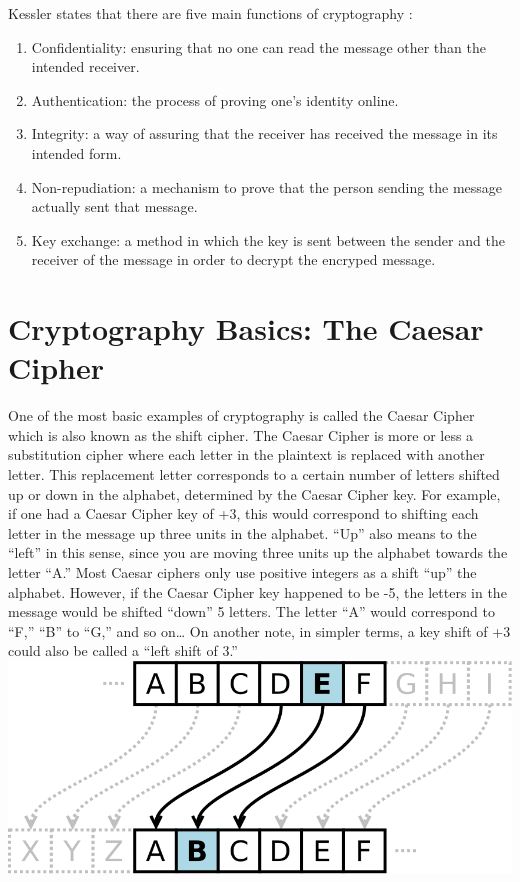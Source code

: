 \documentclass{article}
\begin{document}
Kessler states that there are five main functions of cryptography \cite{ref2:2}:
\begin{enumerate}
    \item Confidentiality: ensuring that no one can read the message other than the intended receiver.
    \item Authentication: the process of proving one’s identity online.
    \item Integrity: a way of assuring that the receiver has received the message in its intended form.
    \item Non-repudiation: a mechanism to prove that the person sending the message actually sent that message.
    \item Key exchange: a method in which the key is sent between the sender and the receiver of the message in order to decrypt the encryped message.
\end{enumerate}

\section{Cryptography Basics: The Caesar Cipher}
One of the most basic examples of cryptography is called the Caesar Cipher which is also known as the shift cipher. The Caesar Cipher is more or less a substitution cipher where each letter in the plaintext is replaced with another letter. This replacement letter corresponds to a certain number of letters shifted up or down in the alphabet, determined by the Caesar Cipher key. For example, if one had a Caesar Cipher key of +3, this would correspond to shifting each letter in the message up three units in the alphabet. “Up” also means to the “left” in this sense, since you are moving three units up the alphabet towards the letter “A.” Most Caesar ciphers only use positive integers as a shift “up” the alphabet. However, if the Caesar Cipher key happened to be -5, the letters in the message would be shifted “down” 5 letters. The letter “A” would correspond to “F,” “B” to “G,” and so on… On another note, in simpler terms, a key shift of +3 could also be called a “left shift of 3.”\\

\includegraphics[scale=0.47]{caesar_cipher}
\end{document}
